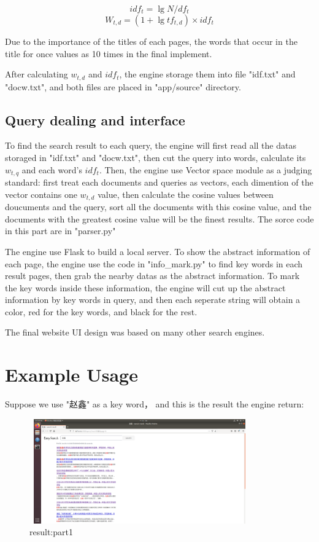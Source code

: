 \documentclass[a4paper]{article}
\begin{document}
\begin{equation*}
idf_t = \lg {N / df_t}
\end{equation*}
\begin{equation*}
W_{t,d}= (1 + \lg {tf_{t,d}} ) \times idf_t
\end{equation*}

Due to the importance of the titles of each pages, the words that occur in the title for once values as 10 times in the final implement. 

After calculating $w_{t,d}$ and $idf_t$, the engine storage them into file "idf.txt" and "docw.txt", and both files are placed in "app/source" directory.

\subsection{Query dealing and interface}

To find the search result to each query, the engine will first read all the datas storaged in "idf.txt" and "docw.txt", then cut the query into words, calculate its $w_{t,q}$ and each word's $idf_t$. Then, the engine use Vector space module as a judging standard: first treat each documents and queries as vectors, each dimention of the vector contains one $w_{t,d}$ value, then calculate the cosine values between doucuments and the query, sort all the documents with this cosine value, and the documents with the greatest cosine value will be the finest results. The sorce code in this part are in "parser.py" 

The engine use Flask to build a local server. To show the abstract information of each page, the engine use the code in "info\_mark.py" to find key words in each result pages, then grab the nearby datas as the abstract information. To mark the key words inside these information, the engine will cut up the abstract information by key words in query, and then each seperate string will obtain a color, red for the key words, and black for the rest. 

The final website UI design was based on many other search engines. 

\section{Example Usage}

Suppose we use "赵鑫" as a key word， and this is the result the engine return:

\begin{figure}[H]
\centering
\includegraphics[height=4.5cm,width=9.5cm]{1.png}
\caption{result:part1}
\label{2}
\end{figure}
\end{document}
